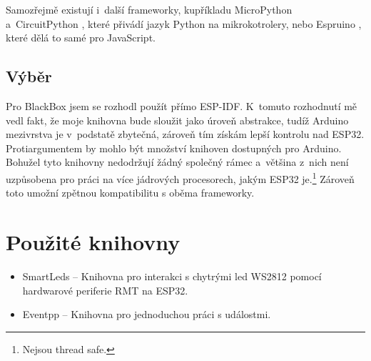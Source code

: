 Samozřejmě existují i~další frameworky, kupříkladu MicroPython \cite{uPython} a~CircuitPython \cite{circuitPython}, které přivádí jazyk Python na mikrokotrolery, nebo Espruino \cite{espruino}, které dělá to samé pro JavaScript.

\subsection{Výběr}

Pro BlackBox jsem se rozhodl použít přímo ESP-IDF.
K~tomuto rozhodnutí mě vedl fakt, že moje knihovna bude sloužit jako úroveň abstrakce, tudíž Arduino mezivrstva je v~podstatě zbytečná, zároveň tím získám lepší kontrolu nad ESP32.
Protiargumentem by mohlo být množství knihoven dostupných pro Arduino.
Bohužel tyto knihovny nedodržují žádný společný rámec a~většina z~nich není uzpůsobena pro práci na více jádrových procesorech, jakým ESP32 je.\footnote{Nejsou thread safe.}
Zároveň toto umožní zpětnou kompatibilitu s oběma frameworky.

\section{Použité knihovny}

\begin{itemize}
    \item SmartLeds \cite{SmartLeds} --
        Knihovna pro interakci s chytrými led WS2812 pomocí hardwarové periferie RMT na ESP32. %
    \item Eventpp --
        Knihovna pro jednoduchou práci s událostmi.
\end{itemize}